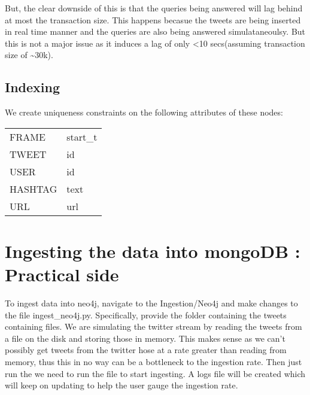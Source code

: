 \documentclass[letterpaper,10pt,english]{sphinxmanual}
\begin{document}
But, the clear downside of this is that the queries being answered will lag behind at most the transaction size. This happens becasue the tweets are being inserted in real time manner and the queries are also being answered simulataneoulsy. But this is not a major issue as it induces a lag of only \textless{}10 secs(assuming transaction size of \textasciitilde{}30k).


\subsection{Indexing}
\label{\detokenize{neo4j_data_ingestion:indexing}}
We create uniqueness constraints on the following attributes of these nodes:


\begin{savenotes}\sphinxattablestart
\centering
\begin{tabulary}{\linewidth}[t]{|T|T|}
\hline
{}\relax &\relax \\
\hline
FRAME
&
start\_t
\\
\hline
TWEET
&
id
\\
\hline
USER
&
id
\\
\hline
HASHTAG
&
text
\\
\hline
URL
&
url
\\
\hline
\end{tabulary}
\par
\sphinxattableend\end{savenotes}


\section{Ingesting the data into mongoDB : Practical side}
\label{\detokenize{neo4j_data_ingestion:ingesting-the-data-into-mongodb-practical-side}}
To ingest data into neo4j, navigate to the Ingestion/Neo4j and make changes to the file ingest\_neo4j.py. Specifically, provide the folder containing the tweets containing files. We are simulating the twitter stream by reading the tweets from a file on the disk and storing those in memory. This makes sense as we can’t possibly get tweets from the twitter hose at a rate greater than reading from memory, thus this in no way can be a bottleneck to the ingestion rate. Then just run the we need to run the file  to start ingesting. A logs file will be created which will keep on updating to help the user gauge the ingestion rate.
\end{document}
